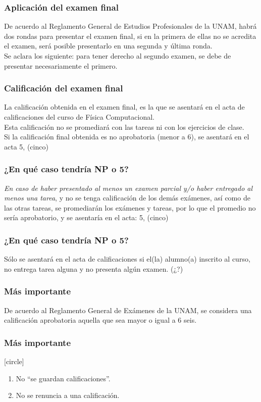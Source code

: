 \documentclass[12pt]{beamer}
\begin{document}
\begin{frame}
\frametitle{Aplicación del examen final}
De acuerdo al Reglamento General de Estudios Profesionales de la UNAM, habrá dos rondas para presentar el examen final, si en la primera de ellas no se acredita el examen, será posible presentarlo en una segunda y última ronda.
\\
\bigskip
\pause
Se aclara los siguiente: \alert{para tener derecho al segundo examen, se debe de presentar necesariamente el primero.}
\end{frame}
\begin{frame}
\frametitle{Calificación del examen final}
La calificación obtenida en el examen final, es la que se asentará en el acta de calificaciones del curso de Física Computacional.
\\
\bigskip
\pause
Esta calificación no se promediará con las tareas ni con los ejercicios de clase.
\\
\bigskip
\pause
Si la calificación final obtenida es no aprobatoria (menor a $6$), se asentará en el acta \alert{5, (cinco)}
\end{frame}
\begin{frame}
\frametitle{\textbf{¿En qué caso tendría NP o 5?}}
\emph{En caso de haber presentado al menos un examen parcial y/o haber entregado al menos una tarea}, y no se tenga calificación de los demás exámenes, así como de las otras tareas, se promediarán los exámenes y tareas, por lo que el promedio no sería aprobatorio, y se asentaría en el acta: \alert{5, (cinco)}
\end{frame}
\begin{frame}
\frametitle{\textbf{¿En qué caso tendría NP o 5?}}
Sólo se asentará en el acta de calificaciones  si el(la) alumno(a) inscrito al curso, no entrega tarea alguna y no presenta algún examen. (¿?)
\end{frame}
\begin{frame}
\frametitle{Más importante}
De acuerdo al Reglamento General de Exámenes de la UNAM, se considera una calificación aprobatoria aquella que sea mayor o igual a $6$ seis.
\end{frame}
\begin{frame}
\frametitle{Más importante}
[circle]
\begin{enumerate}[<+->]
\item No \enquote{se guardan calificaciones}.
\item No se renuncia a una calificación.
\end{enumerate}
\end{frame}
\end{document}
